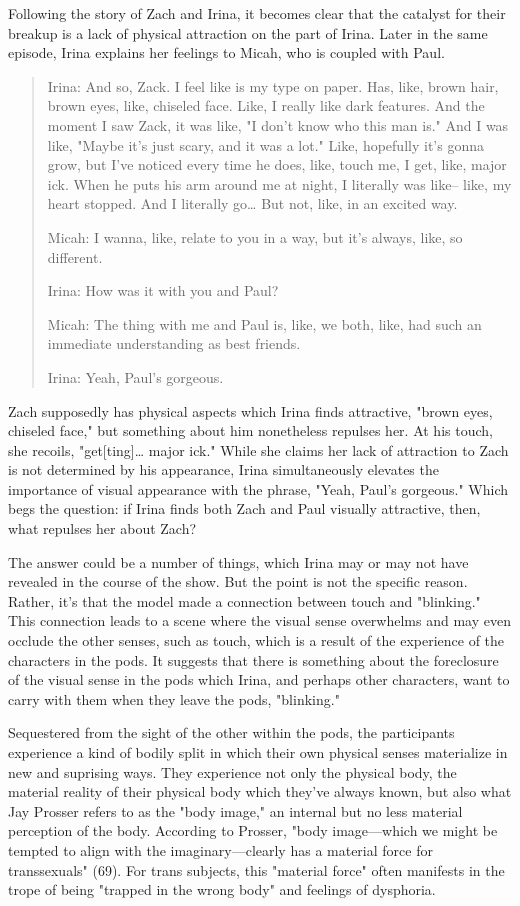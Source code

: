 \documentclass[11pt]{article}
\begin{document}
Following the story of Zach and Irina, it becomes clear that the
catalyst for their breakup is a lack of physical attraction on the
part of Irina. Later in the same episode, Irina explains her feelings
to Micah, who is coupled with Paul.
\begin{quote}
Irina: And so, Zack. I feel like is my type on paper. Has, like, brown
hair, brown eyes, like, chiseled face. Like, I really like dark
features. And the moment I saw Zack, it was like, "I don't know who
this man is." And I was like, "Maybe it's just scary, and it was a
lot." Like, hopefully it's gonna grow, but I've noticed every time he
does, like, touch me, I get, like, major ick. When he puts his arm
around me at night, I literally was like-- like, my heart stopped. And
I literally go\ldots{} But not, like, in an excited way.

Micah: I wanna, like, relate to you in a way, but it's always, like,
so different.

Irina: How was it with you and Paul?

Micah: The thing with me and Paul is, like, we both, like, had such an
immediate understanding as best friends.

Irina: Yeah, Paul's gorgeous.
\end{quote}
Zach supposedly has physical aspects which Irina finds attractive,
"brown eyes, chiseled face," but something about him nonetheless
repulses her. At his touch, she recoils, "get[ting]\ldots{} major ick."
While she claims her lack of attraction to Zach is not determined by
his appearance, Irina simultaneously elevates the importance of visual
appearance with the phrase, "Yeah, Paul's gorgeous." Which begs the
question: if Irina finds both Zach and Paul visually attractive, then,
what repulses her about Zach?

The answer could be a number of things, which Irina may or may not
have revealed in the course of the show. But the point is not the
specific reason. Rather, it's that the model made a connection between
touch and "blinking." This connection leads to a scene where the
visual sense overwhelms and may even occlude the other senses, such as
touch, which is a result of the experience of the characters in the
pods. It suggests that there is something about the foreclosure of the
visual sense in the pods which Irina, and perhaps other characters,
want to carry with them when they leave the pods, "blinking." 

Sequestered from the sight of the other within the pods, the
participants experience a kind of bodily split in which their own
physical senses materialize in new and suprising ways. They experience
not only the physical body, the material reality of their physical
body which they've always known, but also what Jay Prosser refers to
as the "body image," an internal but no less material perception of
the body. According to Prosser, "body image---which we might be
tempted to align with the imaginary---clearly has a material force for
transsexuals" (69). For trans subjects, this "material force" often
manifests in the trope of being "trapped in the wrong body" and
feelings of dysphoria.
\end{document}
